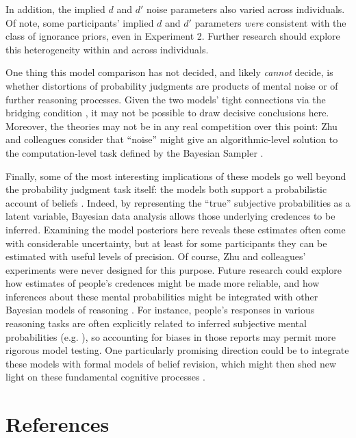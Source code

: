 \documentclass[
  man,floatsintext]{apa6}
\newlength{\cslhangindent}
\newlength{\cslentryspacingunit} %
\newenvironment{CSLReferences}[2] %
 {%
  \setlength{\parindent}{0pt}
  \ifodd #1
  \let\oldpar\par
  \def\par{\hangindent=\cslhangindent\oldpar}
  \fi
  \setlength{\parskip}{#2\cslentryspacingunit}
 }%
 {}
\begin{document}
In addition, the implied \(d\) and \(d'\) noise parameters also varied across individuals. Of note, some participants' implied \(d\) and \(d'\) parameters \emph{were} consistent with the class of ignorance priors, even in Experiment 2. Further research should explore this heterogeneity within and across individuals.

One thing this model comparison has not decided, and likely \emph{cannot} decide, is whether distortions of probability judgments are products of mental noise or of further reasoning processes. Given the two models' tight connections via the bridging condition \autocite{zhu.etal2020}, it may not be possible to draw decisive conclusions here. Moreover, the theories may not be in any real competition over this point: Zhu and colleagues consider that ``noise'' might give an algorithmic-level solution to the computation-level task defined by the Bayesian Sampler \autocite*{zhu.etal2020}.

Finally, some of the most interesting implications of these models go well beyond the probability judgment task itself: the models both support a probabilistic account of beliefs \autocite{chater.etal2020}. Indeed, by representing the ``true'' subjective probabilities as a latent variable, Bayesian data analysis allows those underlying credences to be inferred. Examining the model posteriors here reveals these estimates often come with considerable uncertainty, but at least for some participants they can be estimated with useful levels of precision. Of course, Zhu and colleagues' \autocite*{zhu.etal2020} experiments were never designed for this purpose. Future research could explore how estimates of people's credences might be made more reliable, and how inferences about these mental probabilities might be integrated with other Bayesian models of reasoning \autocites[e.g.][]{franke.etal2016,jern.etal2014,griffiths.tenenbaum2006}. For instance, people's responses in various reasoning tasks are often explicitly related to inferred subjective mental probabilities (e.g. \textcite{jern.etal2014}), so accounting for biases in those reports may permit more rigorous model testing. One particularly promising direction could be to integrate these models with formal models of belief revision, which might then shed new light on these fundamental cognitive processes \autocites[e.g.][]{cook.lewandowsky2016,jern.etal2014,powell.etal2018}.

\hypertarget{references}{%
\section{References}\label{references}}

\hypertarget{refs}{}
\begin{CSLReferences}{0}{0}
\end{CSLReferences}


\printbibliography
\end{document}

